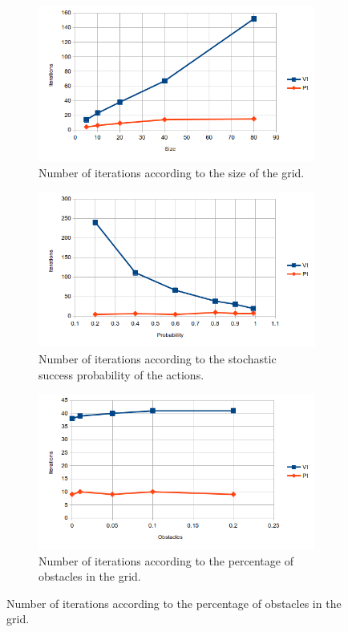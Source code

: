 \documentclass[10pt, twocolumn]{article}
\begin{document}
				\begin{figure}[]
					\centering
					\begin{subfigure}[t]{0.49\textwidth}
						\centering
						\includegraphics[width=.7\textwidth]{../graphics/GridWorld_size_iterations.png}
						\caption{Number of iterations according to the size of the grid.}
						\label{fig:GW:size}
					\end{subfigure}
					\begin{subfigure}[t]{0.49\textwidth}
						\centering
						\includegraphics[width=.7\textwidth]{../graphics/GridWorld_probability_iterations.png}
						\caption{Number of iterations according to the stochastic success probability of the actions.}
						\label{fig:GW:probability}
					\end{subfigure}
					\begin{subfigure}[t]{0.49\textwidth}
						\centering
						\includegraphics[width=.7\textwidth]{../graphics/GridWorld_obstacles_iterations.png}
						\caption{Number of iterations according to the percentage of obstacles in the grid.}

\end{subfigure}
\end{figure}
\end{document}
